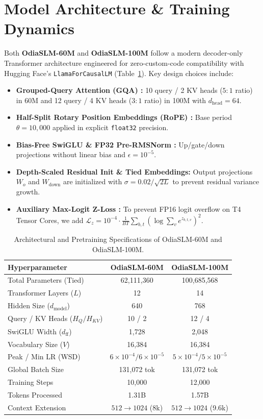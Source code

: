 \documentclass[10pt,twocolumn,letterpaper]{article}
\begin{document}
\section{Model Architecture \& Training Dynamics}
Both \textbf{OdiaSLM-60M} and \textbf{OdiaSLM-100M} follow a modern decoder-only Transformer architecture \cite{dubey2024llama3} engineered for zero-custom-code compatibility with Hugging Face's \texttt{LlamaForCausalLM} (Table~\ref{tab:arch}). Key design choices include:
\begin{itemize}
  \item \textbf{Grouped-Query Attention (GQA) \cite{ainslie2023gqa}:} 10 query / 2 KV heads ($5:1$ ratio) in 60M and 12 query / 4 KV heads ($3:1$ ratio) in 100M with $d_{\text{head}}=64$.
  \item \textbf{Half-Split Rotary Position Embeddings (RoPE) \cite{su2024roformer}:} Base period $\theta = 10,000$ applied in explicit \texttt{float32} precision.
  \item \textbf{Bias-Free SwiGLU \& FP32 Pre-RMSNorm \cite{shazeer2020glu,zhang2019root}:} Up/gate/down projections without linear bias and $\epsilon = 10^{-5}$.
  \item \textbf{Depth-Scaled Residual Init \& Tied Embeddings:} Output projections $W_o$ and $W_{\text{down}}$ are initialized with $\sigma = 0.02 / \sqrt{2L}$ to prevent residual variance growth.
  \item \textbf{Auxiliary Max-Logit Z-Loss \cite{chowdhery2023palm}:} To prevent FP16 logit overflow on T4 Tensor Cores, we add $\mathcal{L}_z = 10^{-4} \cdot \frac{1}{BT}\sum_{b,t} (\log \sum_v e^{z_{b,t,v}})^2$.
\end{itemize}

\begin{table}[t]
\centering
\small
\caption{Architectural and Pretraining Specifications of OdiaSLM-60M and OdiaSLM-100M.}
\label{tab:arch}
\begin{tabular}{lcc}
\toprule
\textbf{Hyperparameter} & \textbf{OdiaSLM-60M} & \textbf{OdiaSLM-100M} \\
\midrule
Total Parameters (Tied) & 62,111,360 & 100,685,568 \\
Transformer Layers ($L$) & 12 & 14 \\
Hidden Size ($d_{\text{model}}$) & 640 & 768 \\
Query / KV Heads ($H_Q / H_{KV}$) & 10 / 2 & 12 / 4 \\
SwiGLU Width ($d_{\text{ff}}$) & 1,728 & 2,048 \\
Vocabulary Size ($V$) & 16,384 & 16,384 \\
Peak / Min LR (WSD) & $6\times 10^{-4} / 6\times 10^{-5}$ & $5\times 10^{-4} / 5\times 10^{-5}$ \\
Global Batch Size & 131,072 tok & 131,072 tok \\
Training Steps & 10,000 & 12,000 \\
Tokens Processed & 1.31B & 1.57B \\
Context Extension & $512 \rightarrow 1024$ (8k) & $512 \rightarrow 1024$ (9.6k) \\
\bottomrule
\end{tabular}
\end{table}
\end{document}
